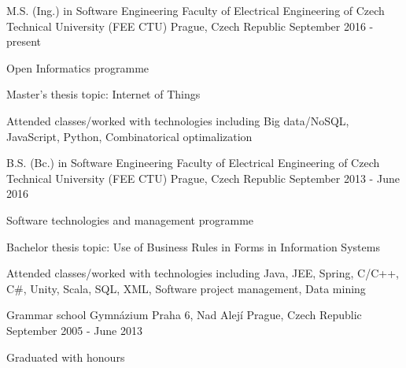 \begin{cventries}
        \cventry
            {M.S. (Ing.) in Software Engineering}
            {Faculty of Electrical Engineering of Czech Technical University (FEE CTU)}
            {Prague, Czech Republic}
            {September 2016 - present}
            {
              \begin{cvitems}
                \item {Open Informatics programme}
                \item {Master's thesis topic: Internet of Things}
                \item {Attended classes/worked with technologies including Big data/NoSQL, JavaScript, Python, Combinatorical optimalization}
              \end{cvitems}
            }
        \cventry
                {B.S. (Bc.) in Software Engineering}
                {Faculty of Electrical Engineering of Czech Technical University (FEE CTU)}
                {Prague, Czech Republic}
                {September 2013 - June 2016}
                {
                  \begin{cvitems}
                    \item {Software technologies and management programme}
                    \item {Bachelor thesis topic: Use of Business Rules in Forms in Information Systems}
                    \item {Attended classes/worked with technologies including Java, JEE, Spring, C/C++, C\#, Unity, Scala, SQL, XML, Software project management, Data mining}
                  \end{cvitems}
                }
        \cventry
                {Grammar school}
                {Gymn\'{a}zium Praha 6, Nad Alej\'{i}}
                {Prague, Czech Republic}
                {September 2005 - June 2013}
                {
                  \begin{cvitems}
                    \item {Graduated with honours}
                  \end{cvitems}
                }
\end{cventries}
